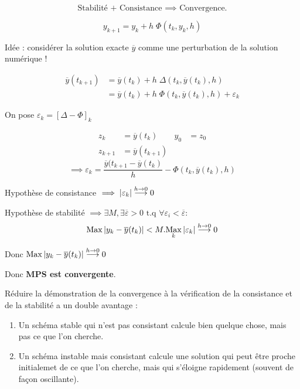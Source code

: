 \begin{ftheo}[Th. Fondamental]
    \[
        \text{Stabilité + Consistance $\implies$ Convergence.}
    \]
\end{ftheo}

\begin{preuve}
    \[
        y_{k+1} = y_k + h \; \Phi(t_k,y_k,h)
    \]

    Idée : considérer la solution exacte $\overline{y}$ comme une perturbation de
    la solution numérique !

    \vspace{-0.5cm}
    \begin{align*}
        \overline{y}(t_{k+1}) & = \overline{y}(t_k) + h \; \Delta (t_k,\overline{y}(t_k),h) \\
        & = \overline{y}(t_k) + h \; \Phi (t_k, \overline{y}(t_k),h) + \varepsilon_k
    \end{align*}

    On pose $\varepsilon_k = [\Delta - \Phi]_k$

    \vspace{-0.5cm}
    \begin{align*}
        z_k & = \overline{y}(t_k) & y_0 & = z_0 \\
        z_{k+1} & = \overline{y}(t_{k+1})
    \end{align*}
    \[
        \implies \varepsilon_k = \frac{\overline{y}(t_{k+1}-\overline{y}(t_k)}{h} -
        \Phi(t_k,\overline{y}(t_k),h)
    \]

    Hypothèse de consistance $\implies \left\lvert\varepsilon_k\right\rvert \overset{h\to0}{\longrightarrow} 0$

    Hypothèse de stabilité $\implies \exists M, \exists \overline{\varepsilon} > 0 \text{ t.q }
    \forall \varepsilon_i < \overline{\varepsilon} :$
    \[
        \operatorname{Max} \left\lvert y_k - \overline{y}(t_k)\right\rvert < M.\underset{k}{\operatorname{Max}} \left\lvert\varepsilon_k\right\rvert \overset{h\to0}{\longrightarrow} 0
    \]

    Donc $\operatorname{Max} \left\lvert y_k - \overline{y}(t_k)\right\rvert \overset{h\to0}{\longrightarrow} 0$

    Donc \textbf{MPS est convergente}.
\end{preuve}

\begin{remark}
    Réduire la démonstration de la convergence à la vérification de la consistance et
    de la stabilité a un double avantage :
    \begin{enumerate}[label=$-$]
        \item Un schéma stable qui n'est pas consistant calcule bien quelque chose, mais
            pas ce que l'on cherche.
        \item Un schéma instable mais consistant calcule une solution qui peut être proche
            initialemet de ce que l'on cherche, mais qui s'éloigne rapidement
            (souvent de façon oscillante).
    \end{enumerate}
\end{remark}

